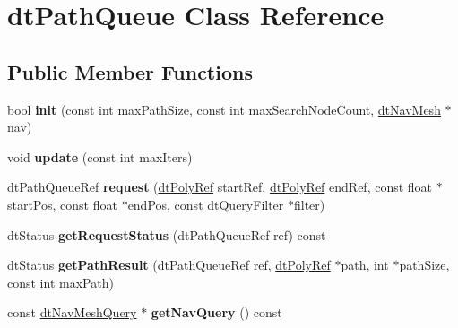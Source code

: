 \hypertarget{classdtPathQueue}{}\section{dt\+Path\+Queue Class Reference}
\label{classdtPathQueue}
\subsection*{Public Member Functions}
\begin{DoxyCompactItemize}
\item 
\mbox{\label{classdtPathQueue_afb36a7890f01f2dbc9be362282538803}} 
bool {\bfseries init} (const int max\+Path\+Size, const int max\+Search\+Node\+Count, \hyperlink{classdtNavMesh}{dt\+Nav\+Mesh} $\ast$nav)
\item 
\mbox{\label{classdtPathQueue_ab28e659d2db86d9f5d5246811cb08da0}} 
void {\bfseries update} (const int max\+Iters)
\item 
\mbox{\label{classdtPathQueue_acc95d9bf0e1b12543be41c3ca938e994}} 
dt\+Path\+Queue\+Ref {\bfseries request} (\hyperlink{group__detour_gab4e0b2257a670c1a800057999612b466}{dt\+Poly\+Ref} start\+Ref, \hyperlink{group__detour_gab4e0b2257a670c1a800057999612b466}{dt\+Poly\+Ref} end\+Ref, const float $\ast$start\+Pos, const float $\ast$end\+Pos, const \hyperlink{classdtQueryFilter}{dt\+Query\+Filter} $\ast$filter)
\item 
\mbox{\label{classdtPathQueue_a2b1a005dfc3d8d3efd1bb4bc46f49e32}} 
dt\+Status {\bfseries get\+Request\+Status} (dt\+Path\+Queue\+Ref ref) const
\item 
\mbox{\label{classdtPathQueue_a6599518fe1e3c0e4c7d8c3cba062aeab}} 
dt\+Status {\bfseries get\+Path\+Result} (dt\+Path\+Queue\+Ref ref, \hyperlink{group__detour_gab4e0b2257a670c1a800057999612b466}{dt\+Poly\+Ref} $\ast$path, int $\ast$path\+Size, const int max\+Path)
\item 
\mbox{\label{classdtPathQueue_ad4fb7d75b1b65ad1db89782f8ad4e8da}} 
const \hyperlink{classdtNavMeshQuery}{dt\+Nav\+Mesh\+Query} $\ast$ {\bfseries get\+Nav\+Query} () const
\item 
\mbox{\label{classdtPathQueue_afb36a7890f01f2dbc9be362282538803}} 

\end{DoxyCompactItemize}
